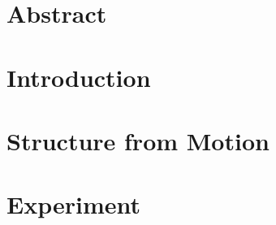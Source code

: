 \documentclass[11pt]{report}
\begin{document}
    
    \newpage
    \chapter{Abstract}
    

    \newpage
    \tableofcontents

    \newpage
    \chapter{Introduction}
    
    

    \newpage
    \chapter{Structure from Motion}
    

    \newpage
    \chapter{Experiment}
    

    
    
    
\end{document}
